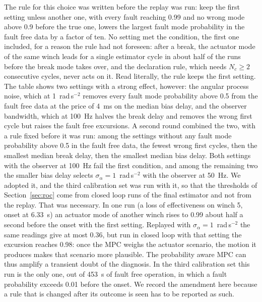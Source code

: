 \documentclass[10pt]{article}
\begin{document}
The rule for this choice was written before the replay was run: keep the first setting unless another one, with every fault reaching 0.99 and no wrong mode above 0.9 before the true one, lowers the largest fault mode probability in the fault free data by a factor of ten. No setting met the condition, the first one included, for a reason the rule had not foreseen: after a break, the actuator mode of the same winch leads for a single estimator cycle in about half of the runs before the break mode takes over, and the declaration rule, which needs $N_c\ge2$ consecutive cycles, never acts on it. Read literally, the rule keeps the first setting. The table shows two settings with a strong effect, however: the angular process noise, which at 1~rad\,s$^{-2}$ removes every fault mode probability above 0.5 from the fault free data at the price of 4~ms on the median bias delay, and the observer bandwidth, which at 100~Hz halves the break delay and removes the wrong first cycle but raises the fault free excursions. A second round combined the two, with a rule fixed before it was run: among the settings without any fault mode probability above 0.5 in the fault free data, the fewest wrong first cycles, then the smallest median break delay, then the smallest median bias delay. Both settings with the observer at 100~Hz fail the first condition, and among the remaining two the smaller bias delay selects $\sigma_\alpha=1$~rad\,s$^{-2}$ with the observer at 50~Hz. We adopted it, and the third calibration set was run with it, so that the thresholds of Section~\ref{sec:roc} come from closed loop runs of the final estimator and not from the replay. That was necessary. In one run (a loss of effectiveness on winch 5, onset at 6.33~s) an actuator mode of another winch rises to 0.99 about half a second before the onset with the first setting. Replayed with $\sigma_\alpha=1$~rad\,s$^{-2}$ the same readings give at most 0.36, but run in closed loop with that setting the excursion reaches 0.98: once the MPC weighs the actuator scenario, the motion it produces makes that scenario more plausible. The probability aware MPC can thus amplify a transient doubt of the diagnosis. In the third calibration set this run is the only one, out of 453~s of fault free operation, in which a fault probability exceeds 0.01 before the onset. We record the amendment here because a rule that is changed after its outcome is seen has to be reported as such.
\end{document}
